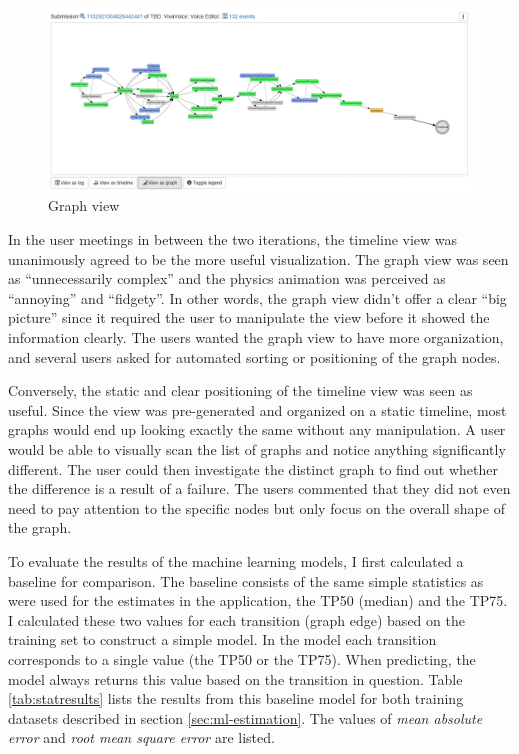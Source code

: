 \begin{figure}[htb]
\centering \includegraphics[width=\linewidth]{gfx/screenshots/graph.png}
\caption{Graph view \label{fig:graph}}
\end{figure}

In the user meetings in between the two iterations, the timeline view was unanimously agreed to be the more useful visualization. 
The graph view was seen as ``unnecessarily complex'' and the physics animation was perceived as ``annoying'' and ``fidgety''. 
In other words, the graph view didn't offer a clear ``big picture'' since it required the user to manipulate the view before it showed the information clearly. 
The users wanted the graph view to have more organization, and several users asked for automated sorting or positioning of the graph nodes.

Conversely, the static and clear positioning of the timeline view was seen as useful.
Since the view was pre-generated and organized on a static timeline, most graphs would end up looking exactly the same without any manipulation.
A user would be able to visually scan the list of graphs and notice anything significantly different.
The user could then investigate the distinct graph to find out whether the difference is a result of a failure.
The users commented that they did not even need to pay attention to the specific nodes but only focus on the overall shape of the graph.

To evaluate the results of the machine learning models, I first calculated a baseline for comparison.
The baseline consists of the same simple statistics as were used for the estimates in the application, the TP50 (median) and the TP75.
I calculated these two values for each transition (graph edge) based on the training set to construct a simple model. 
In the model each transition corresponds to a single value (the TP50 or the TP75). 
When predicting, the model always returns this value based on the transition in question.
Table \ref{tab:statresults} lists the results from this baseline model for both training datasets described in section \ref{sec:ml-estimation}. 
The values of \textit{mean absolute error} and \textit{root mean square error} are listed.

